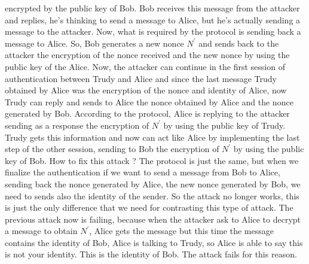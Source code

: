 \documentclass[11pt]{article}
\begin{document}
encrypted by the public key of Bob. Bob receives this message from the attacker and replies, he's thinking to send a message to Alice, but he's actually sending a message to the attacker. Now, what is required by the protocol is sending back a message to Alice. So, Bob generates a new nonce $N^{'}$ and sends back to the attacker the encryption of the nonce received and the new nonce by using the public key of the Alice. Now, the attacker can continue in the first session of authentication between Trudy and Alice and since the
last message Trudy obtained by Alice was the encryption of the nonce and identity of Alice, now Trudy can reply and sends to Alice the nonce obtained by Alice and the nonce generated by Bob. According to the protocol, Alice is replying to the attacker sending as a response the encryption of $N^{'}$ by using the public key of Trudy. Trudy gets this information and now can act like Alice by implementing the last step of the other session, sending to Bob the
encryption of $N^{'}$ by using the public key of Bob. How to fix this attack ? The protocol is just the same, but when we finalize the authentication if we want to send a message from Bob to Alice, sending back the nonce generated by Alice, the new nonce generated by Bob, we need to sends also the identity of the sender. So the attack no longer works, this is just the only difference that we need for contrasting this type of attack. The previous attack now is failing, because when the attacker ask to Alice to decrypt a message to obtain $N^{'}$, Alice gets the message but this time the message contains the identity of Bob, Alice is
talking to Trudy, so Alice is able to say this is not your identity. This is the identity of Bob. The attack fails for this reason.
\end{document}

